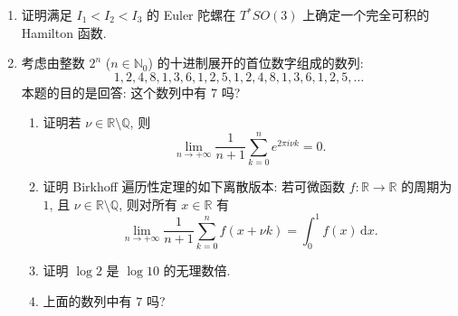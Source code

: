\begin{RiemannExercise}
\begin{enumerate}[label=(\arabic*),ref=\arabic*,leftmargin=*]
\begin{enumerate}[label=(\alph*),leftmargin=*]
\end{enumerate}
\item\label{ex:complete-integrability-of-euler-top}
证明满足 $I_1<I_2<I_3$ 的 Euler 陀螺在 $T^*SO(3)$ 上确定一个完全可积的 Hamilton 函数.
\item\label{ex:leading-digits-of-powers-of-two}
考虑由整数 $2^n$ ($n\in\mathbb{N}_0$) 的十进制展开的首位数字组成的数列:
\[
  1,2,4,8,1,3,6,1,2,5,1,2,4,8,1,3,6,1,2,5,\ldots
\]
本题的目的是回答: 这个数列中有 $7$ 吗?
\begin{enumerate}[label=(\alph*),leftmargin=*]
\item 证明若 $\nu\in\mathbb{R}\setminus\mathbb{Q}$, 则
\[
  \lim_{n\to+\infty}\frac{1}{n+1}\sum_{k=0}^n e^{2\pi i\nu k}=0.
\]
\item {}\label{idx:discrete-birkhoff}证明 Birkhoff 遍历性定理的如下离散版本: 若可微函数 $f:\mathbb{R}\to\mathbb{R}$ 的周期为 $1$, 且 $\nu\in\mathbb{R}\setminus\mathbb{Q}$, 则对所有 $x\in\mathbb{R}$ 有
\[
  \lim_{n\to+\infty}\frac{1}{n+1}\sum_{k=0}^n f(x+\nu k)=\int_0^1 f(x)\,\mathrm{d}x.
\]
\item 证明 $\log 2$ 是 $\log 10$ 的无理数倍.
\item 上面的数列中有 $7$ 吗?
\end{enumerate}
\end{enumerate}
\end{RiemannExercise}
